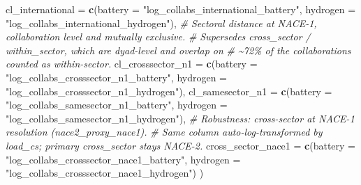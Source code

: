 \documentclass[
]{article}
\newenvironment{Shaded}{\begin{snugshade}}{\end{snugshade}}
\newcommand{\AttributeTok}[1]{\textcolor[rgb]{0.13,0.29,0.53}{#1}}
\newcommand{\CommentTok}[1]{\textcolor[rgb]{0.56,0.35,0.01}{\textit{#1}}}
\newcommand{\FunctionTok}[1]{\textcolor[rgb]{0.13,0.29,0.53}{\textbf{#1}}}
\newcommand{\NormalTok}[1]{#1}
\newcommand{\StringTok}[1]{\textcolor[rgb]{0.31,0.60,0.02}{#1}}
\begin{document}
\begin{Shaded}
\begin{Highlighting}[]
  \AttributeTok{cl\_international =} \FunctionTok{c}\NormalTok{(}\AttributeTok{battery =} \StringTok{"log\_collabs\_international\_battery"}\NormalTok{,}
                       \AttributeTok{hydrogen =} \StringTok{"log\_collabs\_international\_hydrogen"}\NormalTok{),}
  \CommentTok{\# Sectoral distance at NACE{-}1, collaboration level and mutually exclusive.}
  \CommentTok{\# Supersedes cross\_sector / within\_sector, which are dyad{-}level and overlap on}
  \CommentTok{\# \textasciitilde{}72\% of the collaborations counted as within{-}sector.}
  \AttributeTok{cl\_crosssector\_n1 =} \FunctionTok{c}\NormalTok{(}\AttributeTok{battery =} \StringTok{"log\_collabs\_crosssector\_n1\_battery"}\NormalTok{,}
                        \AttributeTok{hydrogen =} \StringTok{"log\_collabs\_crosssector\_n1\_hydrogen"}\NormalTok{),}
  \AttributeTok{cl\_samesector\_n1  =} \FunctionTok{c}\NormalTok{(}\AttributeTok{battery =} \StringTok{"log\_collabs\_samesector\_n1\_battery"}\NormalTok{,}
                        \AttributeTok{hydrogen =} \StringTok{"log\_collabs\_samesector\_n1\_hydrogen"}\NormalTok{),}
  \CommentTok{\# Robustness: cross{-}sector at NACE{-}1 resolution (nace2\_proxy\_nace1).}
  \CommentTok{\# Same column auto{-}log{-}transformed by load\_cs; primary cross\_sector stays NACE{-}2.}
  \AttributeTok{cross\_sector\_nace1 =} \FunctionTok{c}\NormalTok{(}\AttributeTok{battery =} \StringTok{"log\_collabs\_crosssector\_nace1\_battery"}\NormalTok{,}
                         \AttributeTok{hydrogen =} \StringTok{"log\_collabs\_crosssector\_nace1\_hydrogen"}\NormalTok{)}
\NormalTok{)}
\end{Highlighting}
\end{Shaded}
\end{document}
